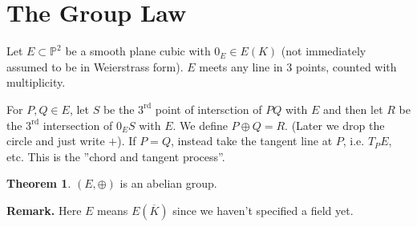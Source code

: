 \documentclass{article}
\theoremstyle{definition}
\newtheorem{theorem}{Theorem}[section]
\begin{document}
\section{The Group Law}
Let $E \subset \mathbb{P}^2$ be a smooth plane cubic with $0_E \in E(K)$ (not immediately assumed to be in Weierstrass form). $E$ meets any line in 3 points, counted with multiplicity.
\vspace{1mm}
 
For $P,Q \in E$, let $S$ be the $3^{\text{rd}}$ point of intersction of $PQ$ with $E$ and then let $R$ be the $3^{\text{rd}}$ intersection of $0_ES$ with $E$. We define $P \oplus Q = R$. (Later we drop the circle and just write $+$). If $P=Q$, instead take the tangent line at $P$, i.e. $T_PE$, etc. This is the ''chord and tangent process''.
\begin{theorem}
    $(E, \oplus)$ is an abelian group.
\end{theorem}
\textbf{Remark.} Here $E$ means $E(\overline{K})$ since we haven't specified a field yet.
\end{document}
